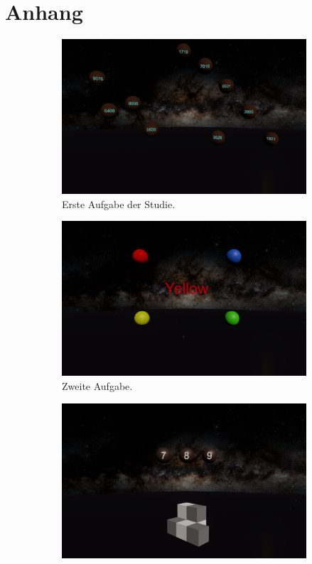 \chapter{Anhang}

\begin{figure}
	\centering
	\begin{subfigure}{0.48\textwidth}
		\includegraphics[width=\textwidth]{./images/ordering.png}
		\caption{Erste Aufgabe der Studie.}
		\label{fig:ordering}
	\end{subfigure}%
	\hfill
	\begin{subfigure}{0.48\textwidth}
		\includegraphics[width=\textwidth]{./images/matching.png}
		\caption{Zweite Aufgabe.}
		\label{fig:matching}
	\end{subfigure}
	\hfill
	\begin{subfigure}{0.48\textwidth}
		\includegraphics[width=\textwidth]{./images/counting.png}

\end{subfigure}
\end{figure}
